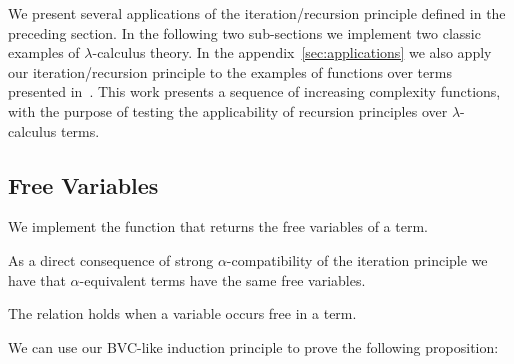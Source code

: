 \documentclass{entcs}
\newcommand{\alp}{\ensuremath{\alpha}}
\newcommand{\lamb}{\ensuremath{\lambda}}
\begin{document}
We present several applications of the iteration/recursion principle defined in the preceding section. In the following two sub-sections we implement two classic examples of \lamb-calculus theory. In the appendix~\ref{sec:applications} we also apply our iteration/recursion principle to the examples of functions over terms presented in~\cite{Norrish04recursivefunction}. This work presents a sequence of increasing complexity functions,  with the purpose of testing the applicability of recursion principles over \lamb-calculus terms. 

\subsection{Free Variables}
\label{sec:freevar}

We implement the function that returns the free variables of a term.


\noindent As a direct consequence of strong \alp-compatibility of the iteration principle we have that \alp-equivalent terms have the same free variables. 

The relation \AgdaFunction{\_*\_} holds when a variable occurs free in a term.

\AgdaTarget{*}

\noindent We can use our BVC-like induction principle to prove the following proposition:

\end{document}

